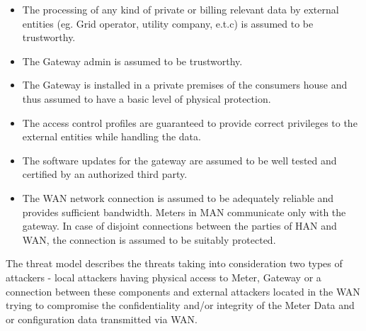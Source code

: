 \begin{itemize}

\item The processing of any kind of private or billing relevant data by external entities (eg. Grid operator, utility company, e.t.c) is assumed to be trustworthy.
\item The Gateway admin is assumed to be trustworthy. 
\item The Gateway is installed in a private premises of the consumers house and thus assumed to have a basic level of physical protection.
\item The access control profiles are guaranteed to provide correct privileges to the external entities while handling the data.
\item The software updates for the gateway are assumed to be well tested and certified by an authorized third party. 
\item The WAN network connection is assumed to be adequately reliable and provides sufficient bandwidth. Meters in MAN communicate only with the gateway. In case of disjoint connections between the parties of HAN and WAN, the connection is assumed to be suitably protected.
\end{itemize}

The threat model describes the threats taking into consideration two types of attackers - local attackers having physical access to Meter, Gateway or a connection between these components and external attackers located in the WAN trying to compromise the confidentiality and/or integrity of the Meter Data and or configuration data transmitted via WAN.

